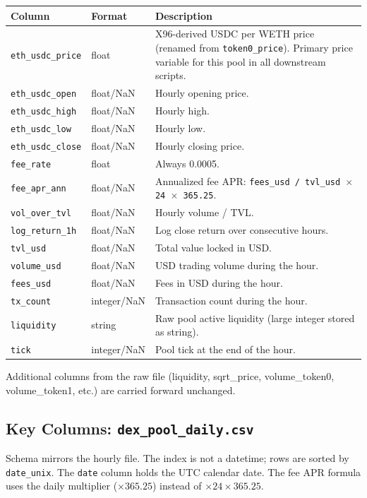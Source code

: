 \documentclass[11pt,a4paper]{article}
\begin{document}
\begin{xltabular}{\linewidth}{L{4.5cm}L{3.0cm}Y}
\toprule
\textbf{Column} & \textbf{Format} & \textbf{Description} \\
\midrule
\texttt{eth\_usdc\_price} & float & X96-derived USDC per WETH price
  (renamed from \texttt{token0\_price}). Primary price variable for
  this pool in all downstream scripts. \\
\texttt{eth\_usdc\_open} & float/NaN & Hourly opening price. \\
\texttt{eth\_usdc\_high} & float/NaN & Hourly high. \\
\texttt{eth\_usdc\_low} & float/NaN & Hourly low. \\
\texttt{eth\_usdc\_close} & float/NaN & Hourly closing price. \\
\texttt{fee\_rate} & float & Always 0.0005. \\
\texttt{fee\_apr\_ann} & float/NaN & Annualized fee APR:
  \texttt{fees\_usd / tvl\_usd $\times$ 24 $\times$ 365.25}. \\
\texttt{vol\_over\_tvl} & float/NaN & Hourly volume / TVL. \\
\texttt{log\_return\_1h} & float/NaN & Log close return over consecutive
  hours. \\
\texttt{tvl\_usd} & float/NaN & Total value locked in USD. \\
\texttt{volume\_usd} & float/NaN & USD trading volume during the hour. \\
\texttt{fees\_usd} & float/NaN & Fees in USD during the hour. \\
\texttt{tx\_count} & integer/NaN & Transaction count during the hour. \\
\texttt{liquidity} & string & Raw pool active liquidity (large integer
  stored as string). \\
\texttt{tick} & integer/NaN & Pool tick at the end of the hour. \\
\bottomrule
\end{xltabular}

\noindent Additional columns from the raw file (liquidity, sqrt\_price,
volume\_token0, volume\_token1, etc.) are carried forward unchanged.

\subsection{Key Columns: \texttt{dex\_pool\_daily.csv}}

Schema mirrors the hourly file. The index is not a datetime; rows are
sorted by \texttt{date\_unix}. The \texttt{date} column holds the UTC
calendar date. The fee APR formula uses the daily multiplier
($\times 365.25$) instead of $\times 24 \times 365.25$.
\end{document}
